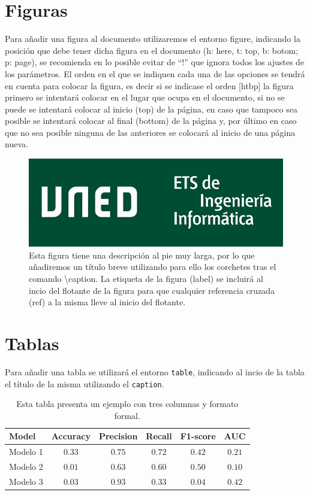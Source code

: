 \section{Figuras}
Para añadir una figura al documento utilizaremos el entorno figure, indicando la posición que debe tener dicha figura en el documento (h: here, t: top, b: botom; p: page), se recomienda en lo posible evitar de ``!'' que ignora todos los ajustes de los parámetros. El orden en el que se indiquen cada una de las opciones se tendrá en cuenta para colocar la figura, es decir si se indicase el orden [htbp] la figura primero se intentará colocar en el lugar que ocupa en el documento, si no se puede se intentará colocar al inicio (top) de la página, en caso que tampoco sea posible se intentará colocar al final (bottom) de la página y, por último en caso que no sea posible ninguna de las anteriores se colocará al inicio de una página nueva.

\begin{figure}[ht]\label{fig:Ejemplo-de-figura}
\begin{centering}
\includegraphics[width=0.5\columnwidth]{imagenes/logo_informatica.png}
\par\end{centering}

\caption[Ejemplo de figura]{Esta figura tiene una descripción al pie muy larga, por lo que añadiremos un título breve utilizando para ello los corchetes tras el comando \textbackslash caption. La etiqueta de la figura (label) se incluirá al incio del flotante de la figura para que cualquier referencia cruzada (ref) a la misma lleve al inicio del flotante.}
\end{figure}

\section{Tablas}
Para añadir una tabla se utilizará el entorno \verb|table|, indicando al incio de la tabla el título de la misma utilizando el \verb|caption|.

\begin{table}[ht]
\label{tab:Ejemplo-de-tabla}
\centering
\caption[Ejemplo de tabla]{Esta tabla presenta un ejemplo con tres columnas y formato formal.}
\begin{tabular}[t]{lccccc}
\hline
Model & Accuracy & Precision & Recall & F1-score & AUC\\
\hline
Modelo 1 & $0.33$ & $0.75$ & $0.72$ & $0.42$ & $0.21$ \\
Modelo 2 & $0.01$ & $0.63$ & $0.60$ & $0.50$ & $0.10$ \\
Modelo 3 & $0.03$ & $0.93$ & $0.33$ & $0.04$ & $0.42$ \\
\hline
\end{tabular}
\end{table}



